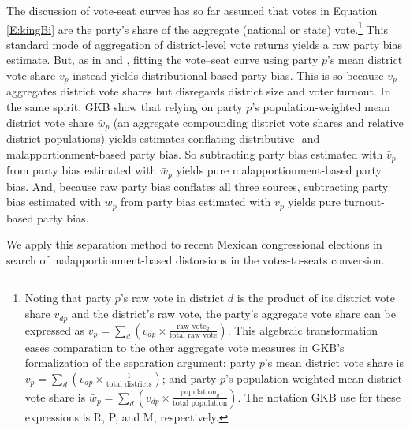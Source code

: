\documentclass[letter,12pt]{article}
\begin{document}
The discussion of vote-seat curves has so far assumed that votes in Equation \ref{E:kingBi} are the party's share of the aggregate (national or state) vote.\footnote{Noting that party $p$'s raw vote in district $d$ is the product of its district vote share $v_{dp}$ and the district's raw vote, the party's aggregate vote share can be expressed as $v_p = \sum_d (v_{dp} \times \frac{\text{raw vote}_d}{\text{total raw vote}})$. This algebraic transformation eases comparation to the other aggregate vote measures in GKB's formalization of the separation argument: party $p$'s mean district vote share is $\bar{v}_p = \sum_d (v_{dp} \times \frac{1}{\text{total districts}})$; and party $p$'s population-weighted mean district vote share is $\bar{w}_p = \sum_d (v_{dp} \times \frac{\text{population}_d}{\text{total population}})$. The notation GKB use for these expressions is R, P, and M, respectively.} This standard mode of aggregation of district-level vote returns yields a raw party bias estimate. But, as in \citet{tufte1973seatsVotes} and \citet{gelman.king.1994EvalElSysRedis}, fitting the vote--seat curve using party $p$'s mean district vote share $\bar{v}_p$ instead yields distributional-based party bias. This is so because $\bar{v}_p$ aggregates district vote shares but disregards district size and voter turnout. In the same spirit, GKB show that relying on party $p$'s population-weighted mean district vote share $\bar{w}_p$ (an aggregate compounding district vote shares and relative district populations) yields estimates conflating distributive- and malapportionment-based party bias. So subtracting party bias estimated with $\bar{v}_p$ from party bias estimated with $\bar{w}_p$ yields pure malapportionment-based party bias. And, because raw party bias conflates all three sources, subtracting party bias estimated with $\bar{w}_p$ from party bias estimated with $v_p$ yields pure turnout-based party bias. 



We apply this separation method to recent Mexican congressional elections in search of malapportionment-based distorsions in the votes-to-seats conversion. 
\end{document}
